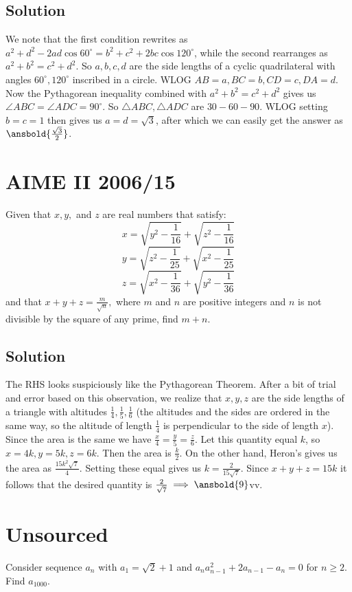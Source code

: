 \documentclass{article}
\begin{document}
\subsection{Solution}
We note that the first condition rewrites as $a^2+d^2-2ad\cos 60^\circ=b^2+c^2+2bc\cos 120^\circ$, while the second rearranges as $a^2+b^2=c^2+d^2$. So $a,b,c,d$ are the side lengths of a cyclic quadrilateral with angles $60^\circ,120^\circ$ inscribed in a circle. WLOG $AB=a,BC=b,CD=c,DA=d$. Now the Pythagorean inequality combined with $a^2+b^2=c^2+d^2$ gives us $\angle ABC=\angle ADC=90^\circ$. So $\triangle ABC,\triangle ADC$ are $30-60-90$. WLOG setting $b=c=1$ then gives us $a=d=\sqrt{3}$, after which we can easily get the answer as $\ansbold{\frac{\sqrt{3}}{2}}$.

\pagebreak\section{AIME II 2006/15}
Given that $x, y,$ and $z$ are real numbers that satisfy:
\[x = \sqrt{y^2-\frac{1}{16}}+\sqrt{z^2-\frac{1}{16}}\]
\[y = \sqrt{z^2-\frac{1}{25}}+\sqrt{x^2-\frac{1}{25}}\]
\[z = \sqrt{x^2-\frac{1}{36}}+\sqrt{y^2-\frac{1}{36}}\]
and that $x+y+z = \frac{m}{\sqrt{n}},$ where $m$ and $n$ are positive integers and $n$ is not divisible by the square of any prime, find $m+n.$

\subsection{Solution}
The RHS looks suspiciously like the Pythagorean Theorem. After a bit of trial and error based on this observation, we realize that $x,y,z$ are the side lengths of a triangle with altitudes $\frac{1}{4},\frac{1}{5},\frac{1}{6}$ (the altitudes and the sides are ordered in the same way, so the altitude of length $\frac{1}{4}$ is perpendicular to the side of length $x$). Since the area is the same we have $\frac{x}{4}=\frac{y}{5}=\frac{z}{6}$. Let this quantity equal $k$, so $x=4k,y=5k,z=6k$. Then the area is $\frac{k}{2}$. On the other hand, Heron's gives us the area as $\frac{15k^2\sqrt{7}}{4}$. Setting these equal gives us $k=\frac{2}{15\sqrt{7}}$. Since $x+y+z=15k$ it follows that the desired quantity is $\frac{2}{\sqrt{7}} \implies \ansbold{9}$vv.

\pagebreak\section{Unsourced}
Consider sequence $a_n$ with $a_1=\sqrt{2}+1$ and $a_na_{n-1}^2+2a_{n-1}-a_n=0$ for $n\geq 2.$ Find $a_{1000}.$
\end{document}
